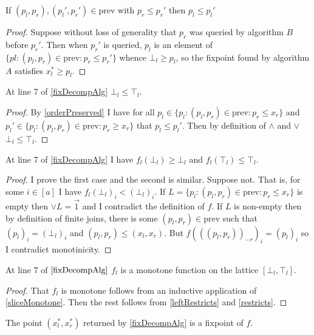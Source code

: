 \begin{lemma}\label{orderPreserved}
  If $(p_l, p_r), (p_l', p_r') \in \mathrm{prev}$ with $p_r \leq p_r'$ then
  $p_l \leq p_l'$
\end{lemma}
\begin{proof}
  Suppose without loss of generality that $p_r$ was queried by algorithm $B$
  before $p_r'$. Then when $p_r'$ is queried, $p_l$ is an element of
  $\{pl : (p_l, p_r) \in \mathrm{prev} : p_r \leq p_r'\}$ whence $\bot_l \geq p_l$,
  so the fixpoint found by algorithm $A$ satisfies $x_l^* \geq p_l$.
\end{proof}
\begin{lemma}
  At line 7 of \cref{fixDecompAlg} $\bot_l \leq \top_l$.
\end{lemma}
\begin{proof}
  By \cref{orderPreserved} I have for all 
  $p_l \in \{p_l : (p_l, p_r) \in \mathrm{prev} : p_r \leq x_r \}$ and
  $p_l' \in \{p_l : (p_l, p_r) \in \mathrm{prev} : p_r \geq x_r \}$ that
  $p_l \leq p_l'$. Then by definition of $\wedge$ and $\vee$ $\bot_l \leq \top_l$.
\end{proof}
\begin{lemma}\label{leftRestricts}
  At line 7 of \cref{fixDecompAlg} I have $f_l(\bot_l) \geq \bot_l$ and $f_l(\top_l) \leq \top_l$.
\end{lemma}
\begin{proof}
  I prove the first case and the second is similar. Suppose not. That is,
  for some $i \in [a]$ I have $f_l(\bot_l)_i < (\bot_l)_i$. If 
  $L = \{p_l : (p_l, p_r) \in \mathrm{prev} : p_r \leq x_r \}$ is empty then
  $\vee L = \vec{1}$ and I contradict the definition of $f$. If $L$ is non-empty then by definition
  of finite joins, there is some $(p_l, p_r) \in \mathrm{prev}$ such that $(p_l)_i = (\bot_l)_i$
  and $(p_l, p_r) \leq (x_l, x_r)$. But $f(((p_l, p_r))_{-r})_i = (p_l)_i$ so
  I contradict monotinicity.
\end{proof}
\begin{lemma}
  At line 7 of $\cref{fixDecompAlg}$ $f_l$ is a monotone function on the lattice
  $[\bot_l, \top_l]$.
\end{lemma}
\begin{proof}
  That $f_l$ is monotone follows from an inductive application of \cref{sliceMonotone}.
  Then the rest follows from \cref{leftRestricts} and \cref{restricts}.
\end{proof}
\begin{prop}
  The point $(x_l^*, x_r^*)$ returned by \cref{fixDecompAlg} is a fixpoint of $f$.
\end{prop}
